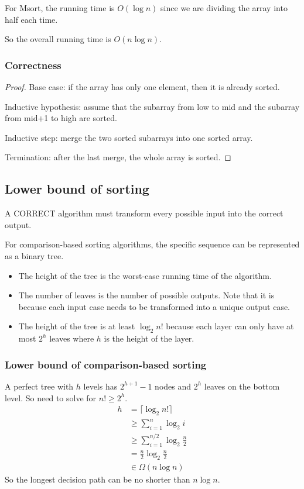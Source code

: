 \documentclass[letterpaper,12pt]{article}
\begin{document}
For Msort, the running time is $O(\log n)$ since we are dividing the array into half each time.

So the overall running time is $O(n\log n)$.
\subsubsection{Correctness}
\begin{proof}
    Base case: if the array has only one element, then it is already sorted.

    Inductive hypothesis: assume that the subarray from low to mid and the subarray from mid+1 to high are sorted.

    Inductive step: merge the two sorted subarrays into one sorted array.

    Termination: after the last merge, the whole array is sorted.
\end{proof}
\subsection{Lower bound of sorting}
A CORRECT algorithm must transform every possible input into the correct output. 

For comparison-based sorting algorithms, the specific sequence can be represented as a binary tree. \begin{itemize}
    \item The height of the tree is the worst-case running time of the algorithm.
    \item The number of leaves is the number of possible outputs. Note that it is because each input case needs to be transformed into a unique output case. 
    \item The height of the tree is at least $\log_2 n!$ because each layer can only have at most $2^h$ leaves where $h$ is the height of the layer.
\end{itemize}
\subsubsection{Lower bound of comparison-based sorting}
A perfect tree with $h$ levels has $2^{h+1}-1$ nodes and $2^h$ leaves on the bottom level. So need to solve for $n! \geq 2^h$.
\begin{align*}
    h &= \lceil \log_2 n! \rceil \\
    &\geq \sum_{i=1}^{n} \log_2 i \\
    &\geq \sum_{i=1}^{n/2} \log_2 \frac{n}{2} \\
    &= \frac{n}{2}\log_2 \frac{n}{2} \\
    &\in \Omega(n\log n)
\end{align*}
So the longest decision path can be no shorter than $n\log n$.
\end{document}

